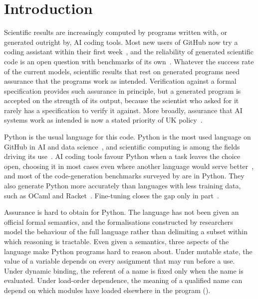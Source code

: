 \section{Introduction}
\label{sec:introduction}

Scientific results are increasingly computed by programs written with, or generated outright by, AI coding
tools. Most new users of GitHub now try a coding assistant within their first
week~\citep{github2025}, and the reliability of generated scientific code is an open question with benchmarks
of its own~\citep{tian2024,chen2025,siegel2024}. Whatever the success rate of the current models, scientific
results that rest on generated programs need assurance that the programs work as intended. Verification
against a formal specification provides such assurance in principle, but a generated program is accepted on
the strength of its output, because the scientist who asked for it rarely has a specification to verify it
against. More broadly, assurance that AI systems work as intended is now a stated priority of UK
policy~\citep{clifford2025,dbt2025}.

Python is the usual language for this code. Python is the most used language on GitHub in AI and data
science~\citep{github2025}, and scientific computing is among the fields driving its use~\citep{github2024}.
AI coding tools favour Python when a task leaves the choice open, choosing it in most cases even where another
language would serve better~\citep{twist2026}, and most of the code-generation benchmarks surveyed by
\citet{siddiq2024} are in Python. They also generate Python more
accurately than languages with less training data, such as OCaml and Racket~\citep{cassano2023}. Fine-tuning
closes the gap only in part~\citep{cassano2024}.

Assurance is hard to obtain for Python. The language has not been given an official formal semantics, and the
formalisations constructed by researchers~\citep{guth2013,kohl2021,politz2013,melancon2023} model the behaviour
of the full language rather than delimiting a subset within which reasoning is tractable. Even given a
semantics, three aspects of the language make Python programs hard to reason about. Under mutable state, the
value of a variable depends on every assignment that may run before a use. Under dynamic binding, the referent
of a name is fixed only when the name is evaluated. Under load-order dependence, the meaning of a qualified
name can depend on which modules have loaded elsewhere in the program ().


